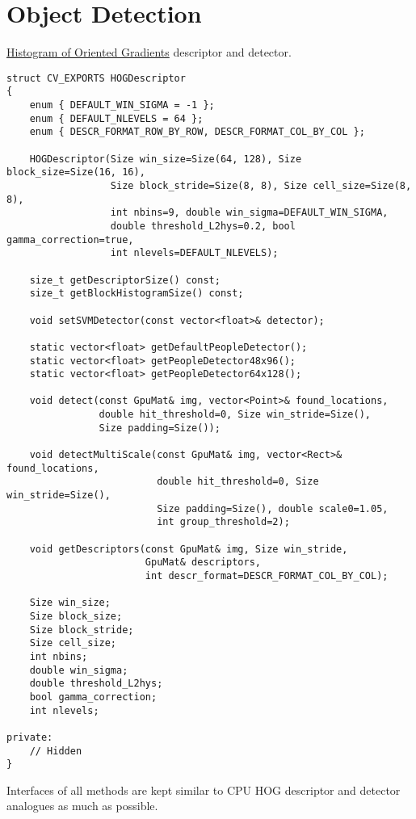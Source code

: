 \section{Object Detection}

\href{http://www.acemedia.org/aceMedia/files/document/wp7/2005/cvpr05-inria.pdf}{Histogram of Oriented Gradients} descriptor and detector.

\begin{lstlisting}
struct CV_EXPORTS HOGDescriptor
{
    enum { DEFAULT_WIN_SIGMA = -1 };
    enum { DEFAULT_NLEVELS = 64 };
    enum { DESCR_FORMAT_ROW_BY_ROW, DESCR_FORMAT_COL_BY_COL };

    HOGDescriptor(Size win_size=Size(64, 128), Size block_size=Size(16, 16),
                  Size block_stride=Size(8, 8), Size cell_size=Size(8, 8),
                  int nbins=9, double win_sigma=DEFAULT_WIN_SIGMA,
                  double threshold_L2hys=0.2, bool gamma_correction=true,
                  int nlevels=DEFAULT_NLEVELS);

    size_t getDescriptorSize() const;
    size_t getBlockHistogramSize() const;

    void setSVMDetector(const vector<float>& detector);

    static vector<float> getDefaultPeopleDetector();
    static vector<float> getPeopleDetector48x96();
    static vector<float> getPeopleDetector64x128();

    void detect(const GpuMat& img, vector<Point>& found_locations, 
                double hit_threshold=0, Size win_stride=Size(), 
                Size padding=Size());

    void detectMultiScale(const GpuMat& img, vector<Rect>& found_locations,
                          double hit_threshold=0, Size win_stride=Size(), 
                          Size padding=Size(), double scale0=1.05, 
                          int group_threshold=2);

    void getDescriptors(const GpuMat& img, Size win_stride, 
                        GpuMat& descriptors,
                        int descr_format=DESCR_FORMAT_COL_BY_COL);

    Size win_size;
    Size block_size;
    Size block_stride;
    Size cell_size;
    int nbins;
    double win_sigma;
    double threshold_L2hys;
    bool gamma_correction;
    int nlevels;

private:
    // Hidden
}
\end{lstlisting}

Interfaces of all methods are kept similar to CPU HOG descriptor and detector analogues as much as possible.


